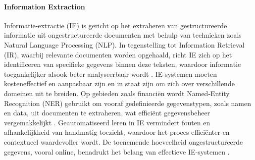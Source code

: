 \paragraph{Information Extraction}
Informatie-extractie (IE) is gericht op het extraheren van gestructureerde informatie uit ongestructureerde documenten met behulp van technieken zoals Natural Language Processing (NLP). In tegenstelling tot Information Retrieval (IR), waarbij relevante documenten worden opgehaald, richt IE zich op het identificeren van specifieke gegevens binnen deze teksten, waardoor informatie toegankelijker alsook beter analyseerbaar wordt \autocite{Javija2024}. IE-systemen moeten kosteneffectief en aanpasbaar zijn en in staat zijn om zich over verschillende domeinen uit te breiden. Op gebieden zoals financiën wordt Named-Entity Recognition (NER) gebruikt om vooraf gedefinieerde gegevenstypen, zoals namen en data, uit documenten te extraheren, wat efficiënt gegevensbeheer vergemakkelijkt \autocite{Gupta2020}. Geautomatiseerd leren in IE vermindert fouten en afhankelijkheid van handmatig toezicht, waardoor het proces efficiënter en contextueel waardevoller wordt. De toenemende hoeveelheid ongestructureerde gegevens, vooral online, benadrukt het belang van effectieve IE-systemen \autocite{Javija2024}.


